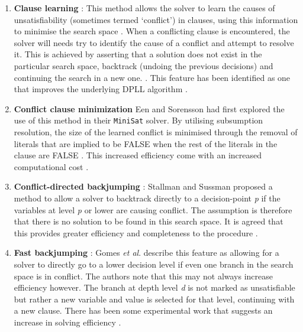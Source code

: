 \documentclass[11pt, a4paper, oneside]{report} %
\begin{document}
\begin{enumerate}


  \item \textbf{Clause learning} :  This method allows the solver to learn the causes of
unsatisfiability (sometimes termed `conflict') in clauses, using this information to minimise the
search space \cite{biere2009conflict}. When a conflicting clause is encountered, the solver will
needs try  to identify the cause of a conflict and attempt to resolve it. This is achieved by
asserting that a solution does not exist in the particular search space, backtrack (undoing the
previous decisions) and continuing the search in a new one. \cite{zhang2002quest}. This feature has
been identified as one that improves the underlying DPLL algorithm
\cite{zhang2002quest,gomes2008satisfiability}.

  \item \textbf{Conflict clause minimization} Een and Sorensson \cite{sorensson2005minisat} had
first explored the use of this method in their \texttt{MiniSat} solver. By utilising subsumption
resolution, the size of the learned conflict is minimised through the removal of literals that are
implied to be FALSE when the rest of the literals in the clause are FALSE \cite{zhang2002quest}.
This increased efficiency come with an increased computational cost \cite{gomes2008satisfiability}.

  \item \textbf{Conflict-directed backjumping} : \indent Stallman and Sussman
\cite{stallman1977forward}   proposed a method to allow a solver to backtrack directly to a
decision-point \textit{p} if the variables at level \textit{p} or lower are causing conflict. The
assumption is therefore that there is no solution to be found in this search space. It is agreed
that this provides greater efficiency and completeness to the procedure
\cite{gomes2008satisfiability}.


  \item \textbf{Fast backjumping} : Gomes \textit{et al}. \cite{gomes2008satisfiability} describe
this feature as allowing for a solver to directly go to a lower decision level if even one branch in
the search space is in conflict. The authors note that this may not always increase efficiency
however. The branch at depth level \textit{d} is not marked as unsatisfiable but rather a new
variable and value is selected for that level, continuing with a new clause. There has been some
experimental work that suggests an increase in solving efficiency \cite{gomes2008satisfiability,
kottler2010sat}.


\end{enumerate}
\end{document}
